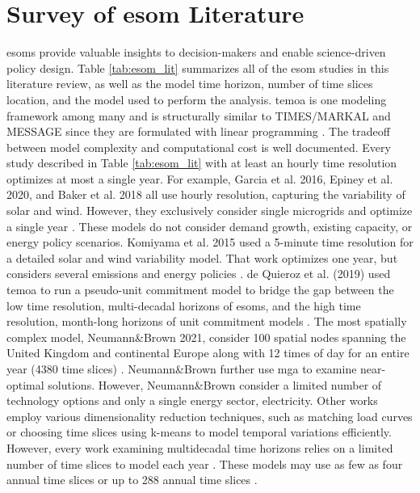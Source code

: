 \section{Survey of \gls{esom} Literature}

\glspl{esom} provide valuable insights to decision-makers and enable science-driven
policy design. Table \ref{tab:esom_lit}
summarizes all of the \gls{esom} studies in this literature review, as well as
the model time horizon, number of time slices location, and the model used to
perform the analysis.
\gls{temoa}
is one modeling framework among many and is structurally similar to TIMES/MARKAL
and MESSAGE since they are formulated with linear programming \cite{yue_review_2018}.
The tradeoff between model complexity and computational cost is well documented.
Every study described in Table \ref{tab:esom_lit} with at least an hourly
time resolution optimizes at most a single year. For example, Garcia et al. 2016,
Epiney et al. 2020, and Baker et al. 2018 all use hourly resolution, capturing
the variability of solar and wind. However, they exclusively consider single microgrids
and optimize a single year
\cite{epiney_economic_2020,baker_optimal_2018,garcia_dynamic_2016}.
These models do not consider demand growth, existing capacity, or energy policy
scenarios. Komiyama et al. 2015 used a 5-minute time resolution for a detailed
solar and wind variability model. That work optimizes one year, but
considers several emissions and energy policies \cite{komiyama_energy_2015}.
de Quieroz et al. (2019) used \gls{temoa} to run a
pseudo-unit commitment model to bridge the gap between the low time resolution,
multi-decadal horizons of \glspl{esom}, and the high time resolution, month-long
horizons of unit commitment models \cite{de_queiroz_repurposing_2019}.
The most spatially complex model, Neumann\&Brown 2021, consider 100 spatial nodes
spanning the United Kingdom and continental Europe along with 12 times of day for
an entire year (4380 time slices) \cite{neumann_near-optimal_2021}. Neumann\&Brown
further use \gls{mga} to examine near-optimal solutions. However, Neumann\&Brown consider
a limited number of technology options and only a single energy sector, electricity.
Other works employ various dimensionality reduction techniques, such as matching
load curves \cite{de_sisternes_value_2016,poncelet_impact_2016} or choosing time
slices using k-means \cite{kotzur_impact_2018} to model temporal variations efficiently.
However, every work examining multidecadal time horizons relies on a limited number
of time slices to model each year
\cite{alzbutas_uncertainty_2012,barron_differential_2015,bennett_extending_2021,
bouckaert_expanding_2014,decarolis_modelling_2016,li_open_2020,poncelet_impact_2016,
seck_embedding_2020,yue_least_2020}. These models may use as few as four annual
time slices \cite{decarolis_modelling_2016} or up to 288 annual time slices
\cite{poncelet_impact_2016}.

